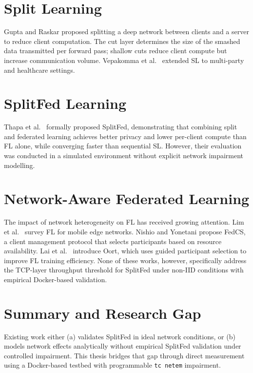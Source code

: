 \documentclass[12pt,a4paper]{report}
\begin{document}
\section{Split Learning}

Gupta and Raskar \cite{gupta2018distributed} proposed splitting a deep network between clients and a server to reduce client computation. The cut layer determines the size of the smashed data transmitted per forward pass; shallow cuts reduce client compute but increase communication volume. Vepakomma et al.\ \cite{vepakomma2018split} extended SL to multi-party and healthcare settings.

\section{SplitFed Learning}

Thapa et al.\ \cite{thapa2022splitfed} formally proposed SplitFed, demonstrating that combining split and federated learning achieves better privacy and lower per-client compute than FL alone, while converging faster than sequential SL. However, their evaluation was conducted in a simulated environment without explicit network impairment modelling.

\section{Network-Aware Federated Learning}

The impact of network heterogeneity on FL has received growing attention. Lim et al.\ \cite{lim2020federated} survey FL for mobile edge networks. Nishio and Yonetani \cite{nishio2019client} propose FedCS, a client management protocol that selects participants based on resource availability. Lai et al.\ \cite{lai2021oort} introduce Oort, which uses guided participant selection to improve FL training efficiency. None of these works, however, specifically address the TCP-layer throughput threshold for SplitFed under non-IID conditions with empirical Docker-based validation.

\section{Summary and Research Gap}

Existing work either (a) validates SplitFed in ideal network conditions, or (b) models network effects analytically without empirical SplitFed validation under controlled impairment. This thesis bridges that gap through direct measurement using a Docker-based testbed with programmable \texttt{tc netem} impairment.
\end{document}
